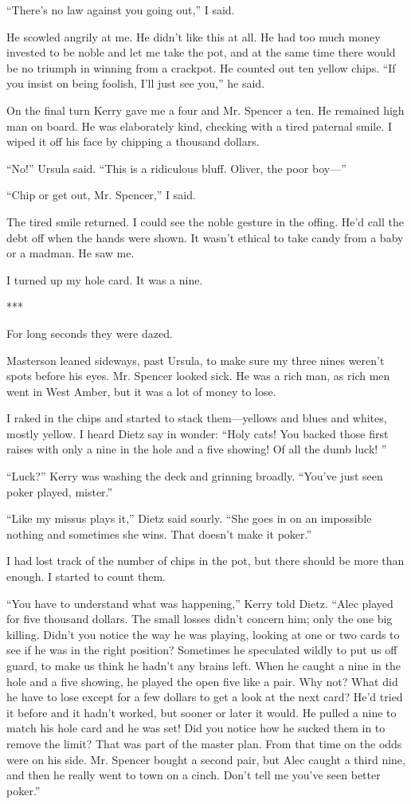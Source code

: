 {“There’s no law against you going out,” I said.

He scowled angrily at me. He didn’t like this at all. He had too much money invested to be noble and let me take the pot, and at the same time there would be no triumph in winning from a crackpot. He counted out ten yellow chips. “If you insist on being foolish, I’ll just see you,” he said.

On the final turn Kerry gave me a four and Mr. Spencer a ten. He remained high man on board. He was elaborately kind, checking with a tired paternal smile. I wiped it off his face by chipping a thousand dollars.

“No!” Ursula said. “This is a ridiculous bluff. Oliver, the poor boy—”

“Chip or get out, Mr. Spencer,” I said.

The tired smile returned. I could see the noble gesture in the offing. He’d call the debt off when the hands were shown. It wasn’t ethical to take candy from a baby or a madman. He saw me.

I turned up my hole card. It was a nine.

***

For long seconds they were dazed.

Masterson leaned sideways, past Ursula, to make sure my three nines weren’t spots before his eyes. Mr. Spencer looked sick. He was a rich man, as rich men went in West Amber, but it was a lot of money to lose.

I raked in the chips and started to stack them—yellows and blues and whites, mostly yellow. I heard Dietz say in wonder: “Holy cats! You backed those first raises with only a nine in the hole and a five showing! Of all the dumb luck! ”

“Luck?” Kerry was washing the deck and grinning broadly. “You’ve just seen poker played, mister.”

“Like my missus plays it,” Dietz said sourly. “She goes in on an impossible nothing and sometimes she wins. That doesn’t make it poker.”

I had lost track of the number of chips in the pot, but there should be more than enough. I started to count them.

“You have to understand what was happening,” Kerry told Dietz. “Alec played for five thousand dollars. The small losses didn’t concern him; only the one big killing. Didn’t you notice the way he was playing, looking at one or two cards to see if he was in the right position? Sometimes he speculated wildly to put us off guard, to make us think he hadn’t any brains left. When he caught a nine in the hole and a five showing, he played the open five like a pair. Why not? What did he have to lose except for a few dollars to get a look at the next card? He’d tried it before and it hadn’t worked, but sooner or later it would. He pulled a nine to match his hole card and he was set! Did you notice how he sucked them in to remove the limit? That was part of the master plan. From that time on the odds were on his side. Mr. Spencer bought a second pair, but Alec caught a third nine, and then he really went to town on a cinch. Don’t tell me you’ve seen better poker.”

}
